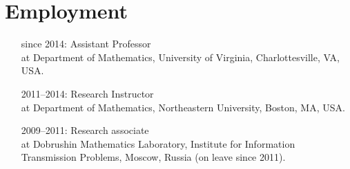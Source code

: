 \documentclass[letterpaper,11pt]{article}
\begin{document}
\section*{Employment}

\begin{itemize}
	\item
	      [since 2014:]
	      Assistant Professor\\
	      at Department of Mathematics,
	      University of Virginia,
	      Charlottesville, VA, USA.

	\item
	      [2011--2014:]
	      Research Instructor\\ at
	      Department of Mathematics,
	      Northeastern University, Boston, MA, USA.

	\item
	      [2009--2011:]
	      Research associate\\
	      at
	      Dobrushin Mathematics Laboratory,
	      Institute for Information Transmission Problems, Moscow, Russia
	      (on leave
	      since 2011).
\end{itemize}
\end{document}
